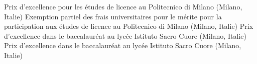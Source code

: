 \documentclass[
  a4paper, 
]{fortysecondscv}
\begin{document}
\begin{cvtable}
		{{\small Prix d'excellence pour les \'etudes de licence au Politecnico di Milano (Milano, Italie)}}
		{{\small Exemption partiel des frais universitaires pour le m\'erite pour la participation aux \'etudes de licence au Politecnico di Milano (Milano, Italie)}}
		{{\small Prix d'excellence dans le baccalaur\'eat au lyc\'ee Istituto Sacro Cuore (Milano, Italie)}}
		{{\small Prix d'excellence dans le baccalaur\'eat au lyc\'ee Istituto Sacro Cuore (Milano, Italie)}}
\end{cvtable}
\end{document}
